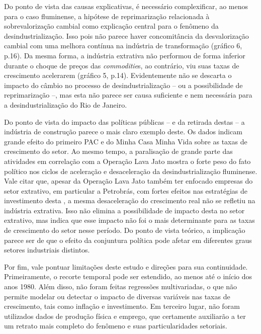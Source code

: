 Do ponto de vista das causas explicativas, é necessário complexificar,
ao menos para o caso fluminense, a hipótese de reprimarização
relacionada à sobrevalorização cambial como explicação central para o
fenômeno da desindustrialização. Isso pois não parece haver
concomitância da desvalorização cambial com uma melhora contínua na
indústria de transformação (gráfico 6, p.16). Da mesma forma, a
indústria extrativa não performou de forma inferior durante o choque de
preços das \emph{commoditie}s, ao contrário, viu suas taxas de
crescimento acelerarem (gráfico 5, p.14). Evidentemente não se descarta
o impacto do câmbio no processo de desindustrialização -- ou a
possibilidade de reprimarização --, mas esta não parece ser causa
suficiente e nem necessária para a desindustrialização do Rio de
Janeiro.

Do ponto de vista do impacto das políticas públicas -- e da retirada
destas -- a indústria de construção parece o mais claro exemplo deste.
Os dados indicam grande efeito do primeiro PAC e do Minha Casa Minha
Vida sobre as taxas de crescimento do setor. Ao mesmo tempo, a
paralisação de grande parte das atividades em correlação com a Operação
Lava Jato mostra o forte peso do fato político nos ciclos de aceleração
e desaceleração da desindustrialização fluminense. Vale citar que,
apesar da Operação Lava Jato também ter enfocado empresas do setor
extrativo, em particular a Petrobrás, com fortes efeitos nas estratégias
de investimento desta
\citep{dieese_implicacoes_2021}, a
mesma desaceleração do crescimento real não se refletiu na indústria
extrativa. Isso não elimina a possibilidade de impacto desta no setor
extrativo, mas indica que esse impacto não foi o mais determinante para
as taxas de crescimento do setor nesse período. Do ponto de vista
teórico, a implicação parece ser de que o efeito da conjuntura política
pode afetar em diferentes graus setores industriais distintos.

Por fim, vale pontuar limitações deste estudo e direções para sua
continuidade. Primeiramente, o recorte temporal pode ser estendido, ao
menos até o início dos anos 1980. Além disso, não foram feitas
regressões multivariadas, o que não permite modelar ou detectar o
impacto de diversas variáveis nas taxas de crescimento, tais como
inflação e investimento. Em terceiro lugar, não foram utilizados dados
de produção física e emprego, que certamente auxiliarão a ter um retrato
mais completo do fenômeno e suas particularidades setoriais.

